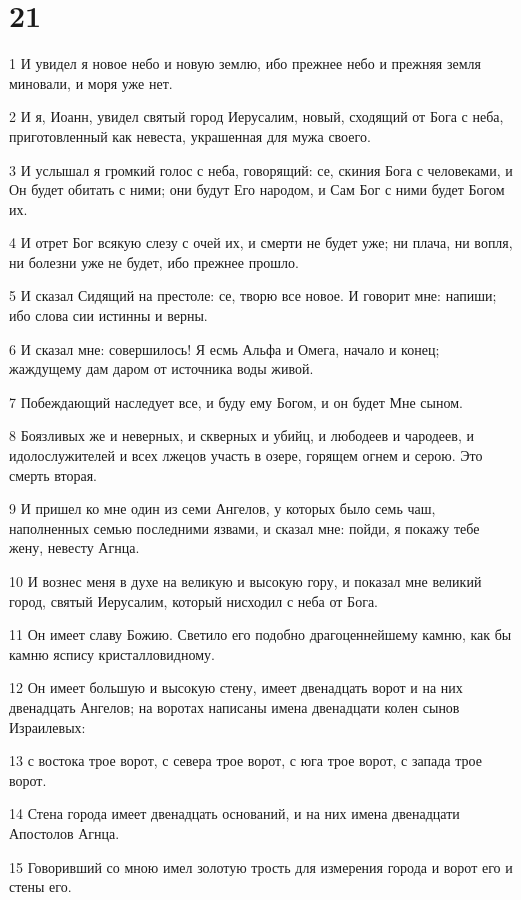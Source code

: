 \chapter{21}

\par 1 И увидел я новое небо и новую землю, ибо прежнее небо и прежняя земля миновали, и моря уже нет.
\par 2 И я, Иоанн, увидел святый город Иерусалим, новый, сходящий от Бога с неба, приготовленный как невеста, украшенная для мужа своего.
\par 3 И услышал я громкий голос с неба, говорящий: се, скиния Бога с человеками, и Он будет обитать с ними; они будут Его народом, и Сам Бог с ними будет Богом их.
\par 4 И отрет Бог всякую слезу с очей их, и смерти не будет уже; ни плача, ни вопля, ни болезни уже не будет, ибо прежнее прошло.
\par 5 И сказал Сидящий на престоле: се, творю все новое. И говорит мне: напиши; ибо слова сии истинны и верны.
\par 6 И сказал мне: совершилось! Я есмь Альфа и Омега, начало и конец; жаждущему дам даром от источника воды живой.
\par 7 Побеждающий наследует все, и буду ему Богом, и он будет Мне сыном.
\par 8 Боязливых же и неверных, и скверных и убийц, и любодеев и чародеев, и идолослужителей и всех лжецов участь в озере, горящем огнем и серою. Это смерть вторая.
\par 9 И пришел ко мне один из семи Ангелов, у которых было семь чаш, наполненных семью последними язвами, и сказал мне: пойди, я покажу тебе жену, невесту Агнца.
\par 10 И вознес меня в духе на великую и высокую гору, и показал мне великий город, святый Иерусалим, который нисходил с неба от Бога.
\par 11 Он имеет славу Божию. Светило его подобно драгоценнейшему камню, как бы камню яспису кристалловидному.
\par 12 Он имеет большую и высокую стену, имеет двенадцать ворот и на них двенадцать Ангелов; на воротах написаны имена двенадцати колен сынов Израилевых:
\par 13 с востока трое ворот, с севера трое ворот, с юга трое ворот, с запада трое ворот.
\par 14 Стена города имеет двенадцать оснований, и на них имена двенадцати Апостолов Агнца.
\par 15 Говоривший со мною имел золотую трость для измерения города и ворот его и стены его.
